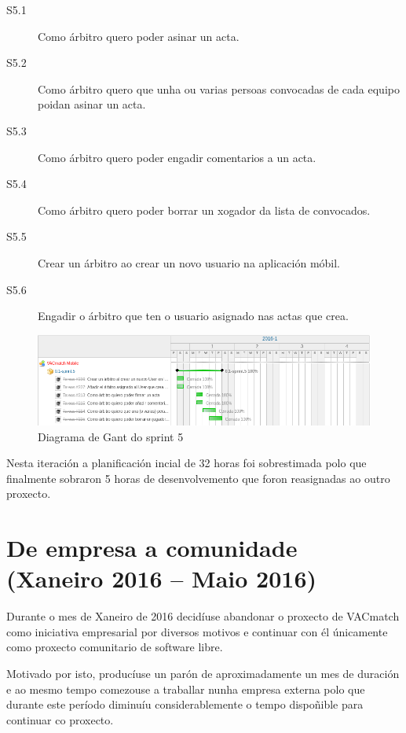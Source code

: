         \begin{description}
         \item [S5.1] Como árbitro quero poder asinar un acta.
         \item [S5.2] Como árbitro quero que unha ou varias persoas convocadas 
de cada equipo poidan asinar un acta.
         \item [S5.3] Como árbitro quero poder engadir comentarios a un acta.
         \item [S5.4] Como árbitro quero poder borrar un xogador da lista de 
convocados.
         \item [S5.5] Crear un árbitro ao crear un novo usuario na aplicación 
móbil.
         \item [S5.6] Engadir o árbitro que ten o usuario asignado nas actas 
que crea.
        \end{description}

        \begin{figure}[h!]
          \begin{center}
          \includegraphics[width=\textwidth]{./img/gant_diagrams/05.png}
          \caption{Diagrama de Gant do sprint 5}
          \label{fig:gant05}
          \end{center}
        \end{figure}

        Nesta iteración a planificación incial de 32 horas foi sobrestimada 
polo que finalmente sobraron 5 horas de desenvolvemento que foron reasignadas 
ao outro proxecto.

  \section{De empresa a comunidade (Xaneiro 2016 -- Maio 2016)}
  Durante o mes de Xaneiro de 2016 decidíuse abandonar o proxecto de VACmatch 
como iniciativa empresarial por diversos motivos e continuar con él únicamente 
como proxecto comunitario de software libre.

  Motivado por isto, producíuse un parón de aproximadamente un mes de duración 
e ao mesmo tempo comezouse a traballar nunha empresa externa polo que durante 
este período diminuíu considerablemente o tempo dispoñible para continuar co 
proxecto.

